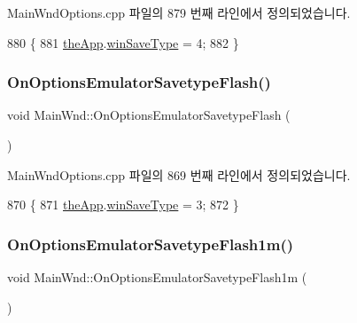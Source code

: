 Main\+Wnd\+Options.\+cpp 파일의 879 번째 라인에서 정의되었습니다.


\begin{DoxyCode}
880 \{
881   \mbox{\hyperlink{_v_b_a_8cpp_a8095a9d06b37a7efe3723f3218ad8fb3}{theApp}}.\mbox{\hyperlink{class_v_b_a_a70060f88010280739406c87ef66d036a}{winSaveType}} = 4;
882 \}
\end{DoxyCode}
\mbox{\label{class_main_wnd_aa52cbad3383a4f2d0f05f4c8e2e5f556}} 
\subsubsection{\texorpdfstring{On\+Options\+Emulator\+Savetype\+Flash()}{OnOptionsEmulatorSavetypeFlash()}}
{\footnotesize\ttfamily void Main\+Wnd\+::\+On\+Options\+Emulator\+Savetype\+Flash (\begin{DoxyParamCaption}{ }\end{DoxyParamCaption})\hspace{0.3cm}{\ttfamily [protected]}}



Main\+Wnd\+Options.\+cpp 파일의 869 번째 라인에서 정의되었습니다.


\begin{DoxyCode}
870 \{
871   \mbox{\hyperlink{_v_b_a_8cpp_a8095a9d06b37a7efe3723f3218ad8fb3}{theApp}}.\mbox{\hyperlink{class_v_b_a_a70060f88010280739406c87ef66d036a}{winSaveType}} = 3;
872 \}
\end{DoxyCode}
\mbox{\label{class_main_wnd_ac70aeadfab0e7ed9120a03f11564f56c}} 
\subsubsection{\texorpdfstring{On\+Options\+Emulator\+Savetype\+Flash1m()}{OnOptionsEmulatorSavetypeFlash1m()}}
{\footnotesize\ttfamily void Main\+Wnd\+::\+On\+Options\+Emulator\+Savetype\+Flash1m (\begin{DoxyParamCaption}{ }\end{DoxyParamCaption})\hspace{0.3cm}{\ttfamily [protected]}}



